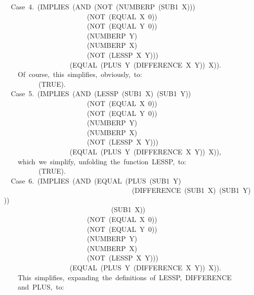 \documentclass[10pt]{book}
\newenvironment{pubasis}{\begin{flushleft}}{\end{flushleft}}
\begin{document}
\begin{pubasis}
~~Case~4.~(IMPLIES~(AND~(NOT~(NUMBERP~(SUB1~X)))\\
~~~~~~~~~~~~~~~~~~~~~~~~(NOT~(EQUAL~X~0))\\
~~~~~~~~~~~~~~~~~~~~~~~~(NOT~(EQUAL~Y~0))\\
~~~~~~~~~~~~~~~~~~~~~~~~(NUMBERP~Y)\\
~~~~~~~~~~~~~~~~~~~~~~~~(NUMBERP~X)\\
~~~~~~~~~~~~~~~~~~~~~~~~(NOT~(LESSP~X~Y)))\\
~~~~~~~~~~~~~~~~~~~(EQUAL~(PLUS~Y~(DIFFERENCE~X~Y))~X)).\\

~~~~Of~course,~this~simplifies,~obviously,~to:\\

~~~~~~~~~~(TRUE).\\

~~Case~5.~(IMPLIES~(AND~(LESSP~(SUB1~X)~(SUB1~Y))\\
~~~~~~~~~~~~~~~~~~~~~~~~(NOT~(EQUAL~X~0))\\
~~~~~~~~~~~~~~~~~~~~~~~~(NOT~(EQUAL~Y~0))\\
~~~~~~~~~~~~~~~~~~~~~~~~(NUMBERP~Y)\\
~~~~~~~~~~~~~~~~~~~~~~~~(NUMBERP~X)\\
~~~~~~~~~~~~~~~~~~~~~~~~(NOT~(LESSP~X~Y)))\\
~~~~~~~~~~~~~~~~~~~(EQUAL~(PLUS~Y~(DIFFERENCE~X~Y))~X)),\\

~~~~which~we~simplify,~unfolding~the~function~LESSP,~to:\\

~~~~~~~~~~(TRUE).\\

~~Case~6.~(IMPLIES~(AND~(EQUAL~(PLUS~(SUB1~Y)\\
~~~~~~~~~~~~~~~~~~~~~~~~~~~~~~~~~~~~~(DIFFERENCE~(SUB1~X)~(SUB1~Y)))\\
~~~~~~~~~~~~~~~~~~~~~~~~~~~~~~~(SUB1~X))\\
~~~~~~~~~~~~~~~~~~~~~~~~(NOT~(EQUAL~X~0))\\
~~~~~~~~~~~~~~~~~~~~~~~~(NOT~(EQUAL~Y~0))\\
~~~~~~~~~~~~~~~~~~~~~~~~(NUMBERP~Y)\\
~~~~~~~~~~~~~~~~~~~~~~~~(NUMBERP~X)\\
~~~~~~~~~~~~~~~~~~~~~~~~(NOT~(LESSP~X~Y)))\\
~~~~~~~~~~~~~~~~~~~(EQUAL~(PLUS~Y~(DIFFERENCE~X~Y))~X)).\\

~~~~This~simplifies,~expanding~the~definitions~of~LESSP,~DIFFERENCE\\
~~~~and~PLUS,~to:\\


\end{pubasis}
\end{document}
